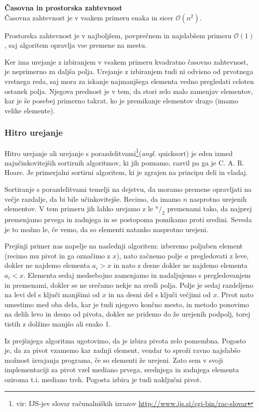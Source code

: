 \documentclass[a4paper,oneside,12pt]{article}
\newcommand{\subsubsubsection}[1]{\vspace*{1ex}\textbf{#1}\\}
\begin{document}
\subsubsubsection{Časovna in prostorska zahtevnost}
Časovna zahtevnost je v vsakem primeru enaka in sicer $\mathcal{O}(n^2)$.

Prostorska zahtevnost je v najboljšem, povprečnem in najslabšem primeru $\mathcal{O}(1)$, 
saj algoritem opravlja vse premene na mestu.

Ker ima urejanje z izbiranjem v vsakem primeru kvadratno časovno zahtevnost, je neprimerno
za daljša polja. Urejanje z izbiranjem tudi ni odvisno od prvotnega vrstnega reda,
saj mora za iskanje najmanjšega elementa vedno pregledati celoten ostanek polja.
Njegova prednost je v tem, da stori zelo malo zamenjav elementov, kar je še posebej
primerno takrat, ko je premikanje elementov drago (imamo velike elemente).

\subsubsection{Hitro urejanje}
\label{chapter:quicksort}
Hitro urejanje ali urejanje s porazdelitvami\footnote{vir: IJS-jev slovar računalniških izrazov
\url{http://www.ijs.si/cgi-bin/rac-slovar}}(\emph{angl.} quicksort) je eden izmed
najučinkovitejših sortirnih algoritmov, ki jih poznamo, razvil pa ga je C. A. R. Hoare.
Je primerjalni sortirni algoritem, ki je zgrajen na principu deli in vladaj.

Sortiranje s porazdelitvami temelji na dejstvu, da moramo premene opravljati na večje
razdalje, da bi bile učinkovitejše. Recimo, da imamo $n$ nasprotno urejenih elementov.
V tem primeru jih lahko urejamo z le $^n/_2$ premenami tako, da najprej premenjamo prvega
in zadnjega in se postopoma pomikamo proti sredini. Seveda je to možno le, če vemo, da so 
elementi natanko nasprotno urejeni.

Prejšnji primer nas napelje na naslednji algoritem: 
izberemo poljuben element (recimo mu pivot in ga označimo z $x$), nato začnemo 
polje $a$ pregledovati z leve, dokler ne najdemo elementa $a_i > x$ in nato z desne dokler ne 
najdemo elementa $a_i < x$. Elementa sedaj medsebojno zamenjamo in nadaljujemo s 
pregledovanjem in premenami, dokler se ne srečamo nekje na sredi polja.
Polje je sedaj razdeljeno na levi del s ključi manjšimi od $x$ in na desni del
s ključi večjimi od $x$. Pivot nato umestimo med oba dela, kar je tudi njegovo končno
mesto, in metodo ponovimo na delih levo in desno od pivota, dokler ne pridemo do že urejenih
podpolj, torej tistih z dolžino manjšo ali enako 1. 

Iz prejšnjega algoritma ugotovimo, da je izbira pivota zelo
pomembna. Pogosto je, da za pivot vzamemo kar zadnji element, vendar to sproži ravno
najslabšo možnost izvajanja programa, če so elementi že urejeni. Zato sem v svoji
implementaciji za pivot vzel mediano prvega, srednjega in zadnjega elementa oziroma t.i.
mediano treh. Pogosta izbira je tudi naključni pivot. 
\end{document}
